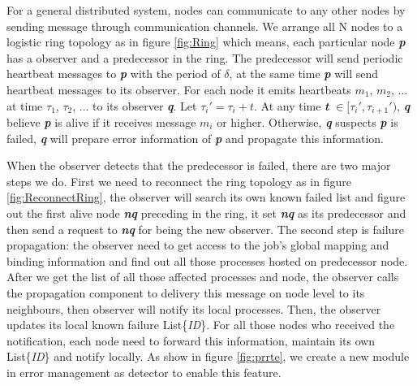 \documentclass[sigconf]{acmart}
\begin{document}
For a general distributed system, nodes can communicate to any other nodes by sending message through communication channels. We arrange all N nodes to a logistic ring topology as in figure \ref{fig:Ring} which means, each particular node \textbf{\textit{p}} has a observer and a predecessor in the ring. The predecessor will send periodic heartbeat messages to \textbf{\textit{p}} with the period of $\delta$, at the same time \textbf{\textit{p}} will send heartbeat messages to its observer. For each node it emits heartbeats $m_1$, $m_2$, ... at time $\tau_1$, $\tau_2$, ... to its observer \textbf{\textit{q}}. Let $\tau_i' = \tau_i + t$. At any time \textbf{\textit{t}} $\in [\tau_i', \tau_{i+1}')$, \textbf{\textit{q}} believe \textbf{\textit{p}} is alive if it receives message $m_i$ or higher. Otherwise, \textbf{\textit{q}} suspects \textbf{\textit{p}} is failed, \textbf{\textit{q}} will prepare error information of \textbf{\textit{p}} and propagate this information. 

When the observer detects that the predecessor is failed, there are two major steps we do. First we need to reconnect the ring topology as in figure \ref{fig:ReconnectRing}, the observer will search its own known failed list and figure out the first alive node \textbf{\textit{nq}} preceding in the ring, it set \textbf{\textit{nq}} as its predecessor and then send a request to \textbf{\textit{nq}} for being the new observer. The second step is failure propagation: the observer need to get access to the job's global mapping and binding information and find out all those processes hosted on predecessor node. After we get the list of all those affected processes and node, the observer calls the propagation component to delivery this message on node level to its neighbours, then observer will notify its local processes. Then, the observer updates its local known failure List\{\textit{ID}\}. For all those nodes who received the notification, each node need to forward this information, maintain its own List\{\textit{ID}\} and notify locally. As show in figure \ref{fig:prrte}, we create a new module in error management as detector to enable this feature.
\end{document}
